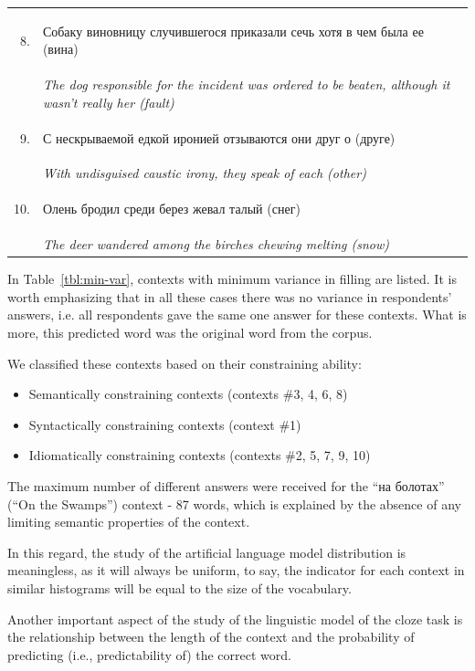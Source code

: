 \documentclass[a4paper]{article}
\begin{document}
\begin{table}
\begin{tabular}{rl}
8. & \begin{russian} Собаку виновницу случившегося приказали сечь хотя в чем была ее (вина)\end{russian} \\
& \textit{ The dog responsible for the incident was ordered to be beaten, although it wasn't really her (fault) } \\
9. & \begin{russian} С нескрываемой едкой иронией отзываются они друг о (друге)\end{russian} \\
& \textit{ With undisguised caustic irony, they speak of each (other) } \\
10. & \begin{russian} Олень бродил среди берез жевал талый (снег)\end{russian} \\
& \textit{ The deer wandered among the birches chewing melting (snow) } \\
\end{tabular}
\end{table}

In Table~\ref{tbl:min-var}, contexts with minimum variance in filling are listed. It is worth emphasizing that in all these cases there was no variance in respondents’ answers, i.e. all respondents gave the same one answer for these contexts. What is more, this predicted word was the original word from the corpus.

We classified these contexts based on their constraining ability:
\begin{itemize}
	\item Semantically constraining contexts (contexts \#3, 4, 6, 8)
	\item Syntactically constraining contexts (context \#1)
	\item Idiomatically constraining contexts (contexts \#2, 5, 7, 9, 10)
\end{itemize}

The maximum number of different answers were received for the “на болотах” (“On the Swamps”) context - 87 words, which is explained by the absence of any limiting semantic properties of the context.

In this regard, the study of the artificial language model distribution is meaningless, as it will always be uniform, to say, the indicator for each context in similar histograms will be equal to the size of the vocabulary.

Another important aspect of the study of the linguistic model of the cloze task is the relationship between the length of the context and the probability of predicting (i.e., predictability of) the correct word.
\end{document}
